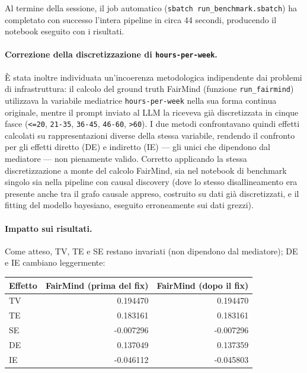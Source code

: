 Al termine della sessione, il job automatico (\texttt{sbatch run\_benchmark.sbatch}) ha completato con successo l'intera pipeline in circa 44 secondi, producendo il notebook eseguito con i risultati.

\paragraph{Correzione della discretizzazione di \texttt{hours-per-week}.}
\`E stata inoltre individuata un'incoerenza metodologica indipendente dai problemi di infrastruttura: il calcolo del ground truth FairMind (funzione \texttt{run\_fairmind}) utilizzava la variabile mediatrice \texttt{hours-per-week} nella sua forma continua originale, mentre il prompt inviato al LLM la riceveva gi\`a discretizzata in cinque fasce (\texttt{<=20}, \texttt{21-35}, \texttt{36-45}, \texttt{46-60}, \texttt{>60}). I due metodi confrontavano quindi effetti calcolati su rappresentazioni diverse della stessa variabile, rendendo il confronto per gli effetti diretto (DE) e indiretto (IE) --- gli unici che dipendono dal mediatore --- non pienamente valido. Corretto applicando la stessa discretizzazione a monte del calcolo FairMind, sia nel notebook di benchmark singolo sia nella pipeline con causal discovery (dove lo stesso disallineamento era presente anche tra il grafo causale appreso, costruito su dati gi\`a discretizzati, e il fitting del modello bayesiano, eseguito erroneamente sui dati grezzi).

\paragraph{Impatto sui risultati.}
Come atteso, TV, TE e SE restano invariati (non dipendono dal mediatore); DE e IE cambiano leggermente:

\begin{center}
\begin{tabular}{lrr}
\toprule
Effetto & FairMind (prima del fix) & FairMind (dopo il fix) \\
\midrule
TV & 0.194470 & 0.194470 \\
TE & 0.183161 & 0.183161 \\
SE & -0.007296 & -0.007296 \\
DE & 0.137049 & 0.137359 \\
IE & -0.046112 & -0.045803 \\
\bottomrule
\end{tabular}
\end{center}

